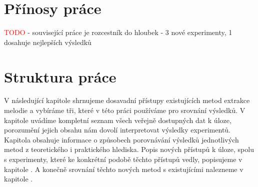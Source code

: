 \section{Přínosy práce}

\textcolor{red}{TODO}
- související práce je rozcestník do hloubek
- 3 nové experimenty, 1 dosahuje nejlepších výsledků

\section{Struktura práce}

V následující kapitole  shrnujeme dosavadní přístupy existujících metod extrakce melodie a vybíráme tři, které v této práci používáme pro srovnání výsledků. V kapitole  uvádíme kompletní seznam všech veřejně dostupných dat k úloze, porozumění jejich obsahu nám dovolí interpretovat výsledky experimentů. Kapitola  obsahuje informace o způsobech porovnávání výsledků jednotlivých metod z teoretického i praktického hlediska. Popis nových přístupů k úloze, spolu s experimenty, které ke konkrétní podobě těchto přístupů vedly, popisujeme v kapitole . A konečně srovnání těchto nových metod s existujícími nalezneme v kapitole .


